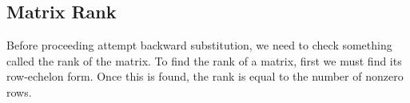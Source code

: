 

\subsection{Matrix Rank}

Before proceeding attempt backward substitution, we need to check something called the rank of the matrix. To find the rank of a matrix, first we must find its row-echelon form. Once this is found, the rank is equal to the number of nonzero rows.

